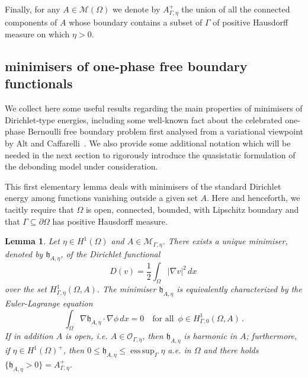 \documentclass[a4paper,11pt,reqno]{amsart}
\numberwithin{equation}{section}
\newtheorem{lemma}[teo]{Lemma}
\theoremstyle{definition}
\theoremstyle{remark}
\DeclareMathOperator*{\esssup}{ess\, sup}
\begin{document}
Finally, for any $A\in \mathcal M(\Omega)$ we denote by $A^+_{\Gamma,\eta}$ the union of all the connected components of $A$ whose boundary contains a subset of $\Gamma$ of positive Hausdorff measure on which $\eta>0$.

\subsection{minimisers of one-phase free boundary functionals}
We collect here some useful results regarding the main properties of minimisers of Dirichlet-type energies, including some well-known fact about the celebrated one-phase Bernoulli free boundary problem first analysed from a variational viewpoint by Alt and Caffarelli~\cite{ALT1981}. We also provide some additional notation which will be needed in the next section to rigorously introduce the quasistatic formulation of the debonding model under consideration.

This first elementary lemma deals with minimisers of the standard Dirichlet energy among functions vanishing outside a given set $A$. Here and henceforth, we tacitly require that $\Omega$ is open, connected, bounded, with Lipschitz boundary and that $\Gamma \subseteq \partial \Omega$ has positive Hausdorff measure.

\begin{lemma}\label{lemma:minimiser_dirichlet}
    Let $\eta\in H^1(\Omega)$ and $A \in \mathcal M_{\Gamma,\eta} $.  There exists a unique minimiser, denoted by $\mathfrak{h}_{A,\eta}$, of the Dirichlet functional
    \[
      D(v) = \frac 12 \int_\Omega |\nabla v|^2 \, dx \,
    \]
    over the set $H^1_{\Gamma,\eta}(\Omega,A)$. The minimiser $\mathfrak{h}_{A, \eta}$ is equivalently characterized by the Euler-Lagrange equation
    \begin{equation}\label{eq:euler_lagrange_dirichlet}
        \int_\Omega \nabla \mathfrak{h}_{A, \eta} \cdot \nabla \phi \, dx  = 0\quad \text{for all } \, \phi \in H^1_{\Gamma, 0}(\Omega, A) \,. 
    \end{equation}
    If in addition $A$ is open, i.e. $A\in\mathcal O_{\Gamma,\eta}$, then $\mathfrak{h}_{A,\eta}$ is harmonic in $A$; furthermore, if $\eta\in H^1(\Omega)^+$, then $0\leq \mathfrak{h}_{A,\eta} \leq \esssup_\Gamma\eta$ a.e. in $\Omega$ and there holds $\{\mathfrak{h}_{A,\eta}>0\}=A^+_{\Gamma,\eta}$.
\end{lemma}
\end{document}
